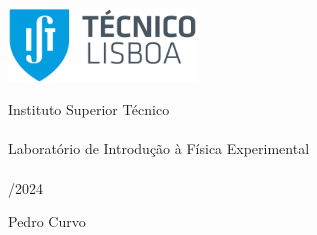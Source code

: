 \thispagestyle {empty}
\begin{center}
\begin{minipage}[c][5cm][t]{\textwidth}
\begin{center}
\includegraphics[width=5cm]{../IST_A_RGB_POS.png}
\end{center}

\end{minipage}
\begin{minipage}[t][10cm][c]{\textwidth}
\centering
{\FontMb Instituto Superior Técnico} \\
\paragraph{}
\centering
{\FontLb\Huge \title{}}
\paragraph{}
\centering
{\FontMb Laboratório de Introdução à Física Experimental} \\
\paragraph{}
{/2024}
\end{minipage}

\begin{minipage}[c][2cm][c]{\textwidth}
\centering
{\FontLn }
\end{minipage}
\begin{minipage}[c][2cm][c]{\textwidth}
\centering
\end{minipage}
\begin{minipage}[c][1cm][c]{\textwidth}
\centering
{}
\end{minipage}
\begin{minipage}[c][3cm][c]{\textwidth}
\centering
{ Pedro Curvo}
\end{minipage}
\begin{minipage}[c][2cm][c]{\textwidth}
\centering

\end{minipage}

\end{center}